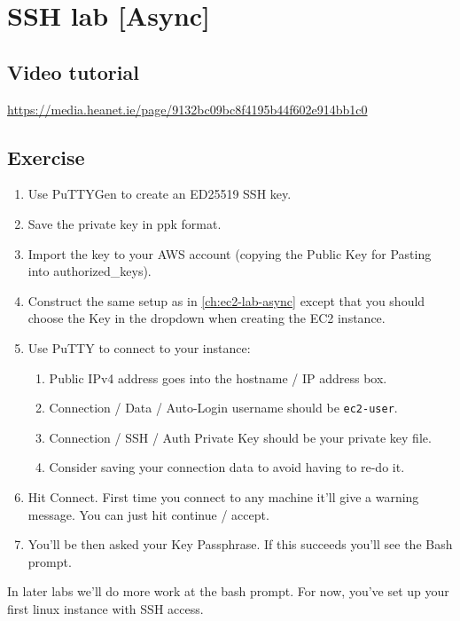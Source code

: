 \chapter{SSH lab [Async]}
\label{ch:ssh-lab-async}

\section{Video tutorial}

\url{https://media.heanet.ie/page/9132bc09bc8f4195b44f602e914bb1c0}

\section{Exercise}

\begin{enumerate}

\item
  Use PuTTYGen to create an ED25519 SSH key.

\item
  Save the private key in ppk format.

\item
  Import the key to your AWS account (copying the Public Key for Pasting into authorized_keys).

\item
  Construct the same setup as in \autoref{ch:ec2-lab-async} except that you should choose the Key in the dropdown when creating the EC2 instance.

\item
  Use PuTTY to connect to your instance:
  \begin{enumerate}
  \item Public IPv4 address goes into the hostname / IP address box.
  \item Connection / Data / Auto-Login username should be \texttt{ec2-user}.
  \item Connection / SSH / Auth Private Key should be your private key file.
  \item Consider saving your connection data to avoid having to re-do it.
  \end{enumerate}

\item
  Hit Connect.
  First time you connect to any machine it'll give a warning message.
  You can just hit continue / accept.

\item 
  You'll be then asked your Key Passphrase.
  If this succeeds you'll see the Bash prompt.

\end{enumerate}

In later labs we'll do more work at the bash prompt.
For now, you've set up your first linux instance with SSH access.

